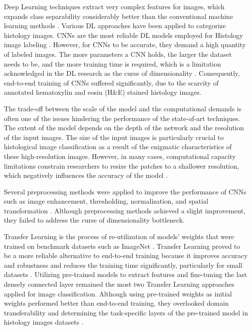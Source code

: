 \documentclass[a4paper, 12 pt, conference]{ieeeconf}
\begin{document}
\quad Deep Learning techniques extract very complex features for images, which expands class separability considerably better than the conventional machine learning methods \cite{Ozturk2018}.  Various DL approaches have been applied to categorize histology images. CNNs are the most reliable DL models employed for Histology image labeling \cite{Aresta2019}. However, for CNNs to be accurate, they demand a high quantity of labeled images. The more parameters a CNN holds, the larger the dataset needs to be, and the more training time is required, which is a limitation acknowledged in the DL research as the curse of dimensionality \cite{Zakerzadeh2014}. Consequently, end-to-end training of CNNs suffered significantly, due to the scarcity of annotated hematoxylin and eosin (H\&E) stained histology images.

\quad The trade-off between the scale of the model and the computational demands is often one of the issues hindering the performance of the state-of-art techniques. The extent of the model depends on the depth of the network and the resolution of the input images. The size of the input images is particularly crucial to histological image classification as a result of the enigmatic characteristics of these high-resolution images. However, in many cases, computational capacity limitations constrain researchers to resize the patches to a shallower resolution, which negatively influences the accuracy of the model \cite{Pimkin2018}.

\quad Several preprocessing methods were applied to improve the performance of CNNs such as image enhancement, thresholding, normalization, and spatial transformation \cite{AzevedoTosta2017, Ozturk2018}. Although preprocessing methods achieved a slight improvement, they failed to address the curse of dimensionality bottleneck.


\quad Transfer Learning is the process of re-utilization of models' weights that were trained on benchmark datasets such as ImageNet \cite{Deng, Hendrycks2019}. Transfer Learning proved to be a more reliable alternative to end-to-end training because it improves accuracy and robustness and reduces the training time significantly, particularly for small datasets \cite{Hendrycks2019}. Utilizing pre-trained models to extract features and fine-tuning the last densely connected layer remained the most two Transfer Learning approaches applied for image classification. Although using pre-trained weights as initial weights performed better than end-to-end training, they overlooked domain transferability and determining the task-specific layers of the pre-trained model in histology images datasets \cite{Yosinski2014}.
\end{document}
